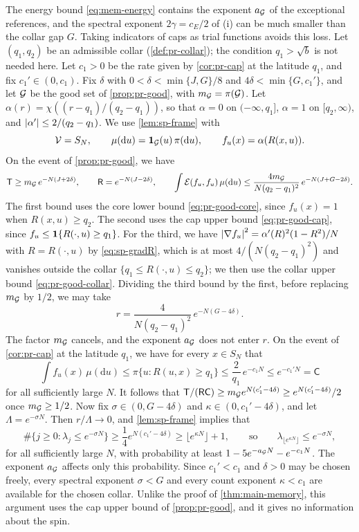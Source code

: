 \begin{remark}\label{rem:mem-direct-frame}
The energy bound \eqref{eq:mem-energy} contains the exponent $a_\mathcal G$ of the exceptional references, and the spectral exponent $2\gamma=c_E/2$ of (i) can be much smaller than the collar gap $G$. Taking indicators of caps as trial functions avoids this loss. Let $(q_1,q_2)$ be an admissible collar (\cref{def:pr-collar}); the condition $q_1>\sqrt b$ is not needed here. Let $c_1>0$ be the rate given by \cref{cor:pr-cap} at the latitude $q_1$, and fix $c_1'\in(0,c_1)$. Fix $\delta$ with $0<\delta<\min\{J,G\}/8$ and $4\delta<\min\{G,c_1'\}$, and let $\mathcal G$ be the good set of \cref{prop:pr-good}, with $m_\mathcal G=\pi(\mathcal G)$. Let $\alpha(r)=\chi((r-q_1)/(q_2-q_1))$, so that $\alpha=0$ on $(-\infty,q_1]$, $\alpha=1$ on $[q_2,\infty)$, and $\left|\alpha'\right|\le2/(q_2-q_1)$. We use \cref{lem:sp-frame} with
\[
\mathcal V=S_N,\qquad \mu(\mathrm du)=\mathbf 1_\mathcal G(u)\,\pi(\mathrm du),\qquad f_u(x)=\alpha(R(x,u)).
\]
On the event of \cref{prop:pr-good}, we have
\[
\mathsf T\ge m_\mathcal G\,e^{-N(J+2\delta)},
\qquad
\mathsf R=e^{-N(J-2\delta)},
\qquad
\int\mathcal E(f_u,f_u)\,\mu(\mathrm du)\le\frac{4m_\mathcal G}{N(q_2-q_1)^2}\,e^{-N(J+G-2\delta)}.
\]
The first bound uses the core lower bound \eqref{eq:pr-good-core}, since $f_u(x)=1$ when $R(x,u)\ge q_2$. The second uses the cap upper bound \eqref{eq:pr-good-cap}, since $f_u\le\mathbf 1\{R(\cdot,u)\ge q_1\}$. For the third, we have $\left|\nabla f_u\right|^2=\alpha'(R)^2(1-R^2)/N$ with $R=R(\cdot,u)$ by \eqref{eq:sp-gradR}, which is at most $4/(N(q_2-q_1)^2)$ and vanishes outside the collar $\{q_1\le R(\cdot,u)\le q_2\}$; we then use the collar upper bound \eqref{eq:pr-good-collar}. Dividing the third bound by the first, before replacing $m_\mathcal G$ by $1/2$, we may take
\[
r=\frac4{N(q_2-q_1)^2}\,e^{-N(G-4\delta)}.
\]
The factor $m_\mathcal G$ cancels, and the exponent $a_\mathcal G$ does not enter $r$. On the event of \cref{cor:pr-cap} at the latitude $q_1$, we have for every $x\in S_N$ that
\[
\int f_u(x)\,\mu(\mathrm du)\le\pi\{u:R(u,x)\ge q_1\}\le\frac2{q_1}\,e^{-c_1N}\le e^{-c_1'N}=\mathsf C
\]
for all sufficiently large $N$. It follows that $\mathsf T/(\mathsf R\mathsf C)\ge m_\mathcal G e^{N(c_1'-4\delta)}\ge e^{N(c_1'-4\delta)}/2$ once $m_\mathcal G\ge1/2$. Now fix $\sigma\in(0,G-4\delta)$ and $\kappa\in(0,c_1'-4\delta)$, and let $\Lambda=e^{-\sigma N}$. Then $r/\Lambda\to0$, and \cref{lem:sp-frame} implies that
\[
\#\{j\ge0:\lambda_j\le e^{-\sigma N}\}\ge\frac14e^{N(c_1'-4\delta)}\ge\lfloor e^{\kappa N}\rfloor+1,
\qquad\text{so}\qquad
\lambda_{\lfloor e^{\kappa N}\rfloor}\le e^{-\sigma N},
\]
for all sufficiently large $N$, with probability at least $1-5e^{-a_\mathcal G N}-e^{-c_1N}$. The exponent $a_\mathcal G$ affects only this probability. Since $c_1'<c_1$ and $\delta>0$ may be chosen freely, every spectral exponent $\sigma<G$ and every count exponent $\kappa<c_1$ are available for the chosen collar. Unlike the proof of \cref{thm:main-memory}, this argument uses the cap upper bound of \cref{prop:pr-good}, and it gives no information about the spin.
\end{remark}
